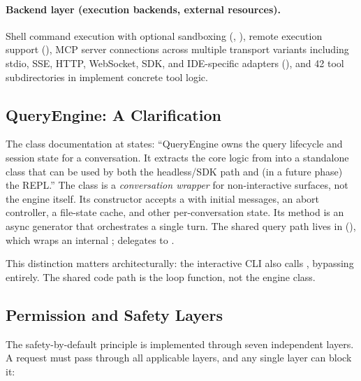 \paragraph{Backend layer (execution backends, external resources).}
Shell command execution with optional sandboxing (, ), remote execution support (), MCP server connections across multiple transport variants including stdio, SSE, HTTP, WebSocket, SDK, and IDE-specific adapters (), and 42 tool subdirectories in  implement concrete tool logic.

\subsection{QueryEngine: A Clarification}
\label{sec:arch:queryengine}

The class documentation at  states: ``QueryEngine owns the query lifecycle and session state for a conversation. It extracts the core logic from  into a standalone class that can be used by both the headless/SDK path and (in a future phase) the REPL.'' The class is a \emph{conversation wrapper} for non-interactive surfaces, not the engine itself. Its constructor accepts a  with initial messages, an abort controller, a file-state cache, and other per-conversation state. Its  method is an async generator that orchestrates a single turn. The shared query path lives in  (), which wraps an internal ;  delegates to .

This distinction matters architecturally: the interactive CLI also calls , bypassing  entirely. The shared code path is the loop function, not the engine class.

\subsection{Permission and Safety Layers}
\label{sec:arch:safety-preview}

The safety-by-default principle is implemented through seven independent layers. A request must pass through all applicable layers, and any single layer can block it:

